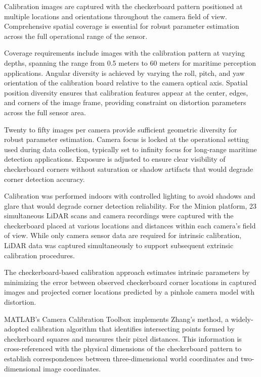 
Calibration images are captured with the checkerboard pattern positioned at multiple locations and orientations throughout the camera field of view.
Comprehensive spatial coverage is essential for robust parameter estimation across the full operational range of the sensor.

Coverage requirements include images with the calibration pattern at varying depths, spanning the range from 0.5 meters to 60 meters for maritime perception applications.
Angular diversity is achieved by varying the roll, pitch, and yaw orientation of the calibration board relative to the camera optical axis.
Spatial position diversity ensures that calibration features appear at the center, edges, and corners of the image frame, providing constraint on distortion parameters across the full sensor area.

Twenty to fifty images per camera provide sufficient geometric diversity for robust parameter estimation.
Camera focus is locked at the operational setting used during data collection, typically set to infinity focus for long-range maritime detection applications.
Exposure is adjusted to ensure clear visibility of checkerboard corners without saturation or shadow artifacts that would degrade corner detection accuracy.

Calibration was performed indoors with controlled lighting to avoid shadows and glare that would degrade corner detection reliability.
For the Minion platform, 23 simultaneous LiDAR scans and camera recordings were captured with the checkerboard placed at various locations and distances within each camera's field of view.
While only camera sensor data are required for intrinsic calibration, LiDAR data was captured simultaneously to support subsequent extrinsic calibration procedures.


The checkerboard-based calibration approach estimates intrinsic parameters by minimizing the error between observed checkerboard corner locations in captured images and projected corner locations predicted by a pinhole camera model with distortion.

MATLAB's Camera Calibration Toolbox implements Zhang's method, a widely-adopted calibration algorithm that identifies intersecting points formed by checkerboard squares and measures their pixel distances.
This information is cross-referenced with the physical dimensions of the checkerboard pattern to establish correspondences between three-dimensional world coordinates and two-dimensional image coordinates.

